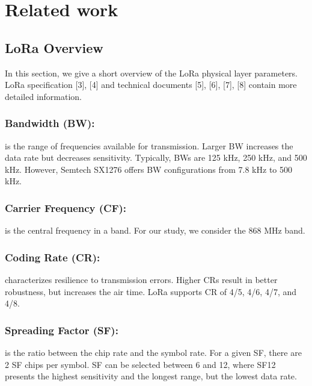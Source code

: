 \section{Related work} \label{sec:Related work}

\subsection{LoRa Overview}
In this section,
	we give a short overview of the LoRa physical layer parameters.
LoRa specification [3],
	[4] and technical documents [5],
	[6],
	[7],
	[8] contain more detailed information.

\subsubsection{Bandwidth (BW):}
	is the range of frequencies available for transmission.
Larger BW increases the data rate but decreases sensitivity.
Typically,
	BWs are 125 kHz, 250 kHz,
	and 500 kHz.
However,
	Semtech SX1276 offers BW configurations from 7.8 kHz to 500 kHz.

\subsubsection{Carrier Frequency (CF):}
	is the central frequency in a band.
For our study,
	we consider the 868 MHz band.

\subsubsection{Coding Rate (CR):}
characterizes resilience to transmission errors.
Higher CRs result in better robustness,
	but increases the air time.
LoRa supports CR of 4/5, 4/6, 4/7,
	and 4/8.

\subsubsection{Spreading Factor (SF):}
is the ratio between the chip rate and the symbol rate.
For a given SF,
	there are 2 SF chips per symbol.
SF can be selected between 6 and 12,
	where SF12 presents the highest sensitivity and the longest range,
	but the lowest data rate.

